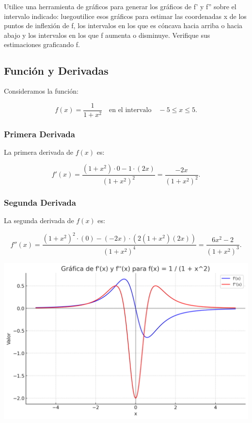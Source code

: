 \documentclass[11pt,letterpaper]{article}
\begin{document}
Utilice una herramienta de gráficos para generar los gráficos de f' y f'' sobre el intervalo indicado: luegoutilice esos gráficos para estimar las coordenadas x de los puntos de inflexión de f, los intervalos en los que es cóncava hacia arriba o hacia abajo y los intervalos en los que f aumenta o disminuye. Verifique sus estimaciones graficando f.

\subsection*{Función y Derivadas}

Consideramos la función:

\[
f(x) = \frac{1}{1+x^2} \quad \text{en el intervalo} \quad -5 \leq x \leq 5.
\]

\subsubsection*{Primera Derivada}

La primera derivada de \( f(x) \) es:

\[
f'(x) = \frac{(1+x^2) \cdot 0 - 1 \cdot (2x)}{(1+x^2)^2} = \frac{-2x}{(1+x^2)^2}.
\]

\subsubsection*{Segunda Derivada}

La segunda derivada de \( f(x) \) es:

\[
f''(x) = \frac{(1+x^2)^2 \cdot (0) - (-2x) \cdot (2(1+x^2)(2x))}{(1+x^2)^4} = \frac{6x^2 - 2}{(1+x^2)^3}.
\]

\begin{center}
    \includegraphics[width=17cm]{./imagenes/grafica1.png}
\end{center}
\end{document}
